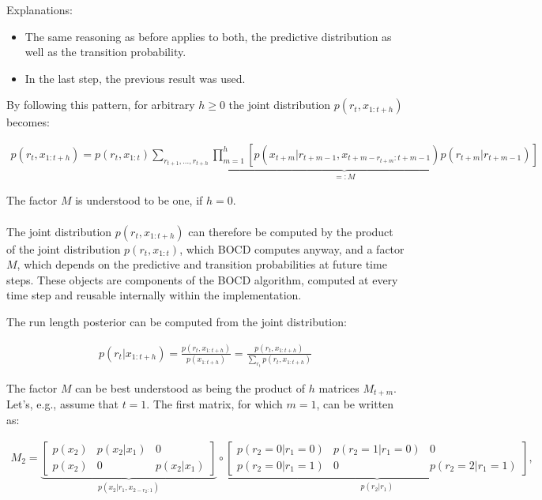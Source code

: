 \documentclass{article}
\begin{document}
Explanations:
\begin{itemize}
    \item The same reasoning as before applies to both, the predictive distribution as well as the transition probability.
    \item In the last step, the previous result was used.
\end{itemize}

By following this pattern, for arbitrary $h\geq0$ the joint distribution $p\left(r_{t},x_{1:t+h}\right)$ becomes:

\begin{align}
p(r_{t},x_{1:t+h})=p(r_{t},x_{1:t})\underbrace{\sum_{r_{t+1},...,r_{t+h}}\prod_{m=1}^{h}\left[p(x_{t+m}\vert r_{t+m-1},x_{t+m-r_{t+m}:t+m-1})p(r_{t+m}\vert r_{t+m-1})\right]}_{=:M}
\end{align}

The factor $M$ is understood to be one, if $h=0$.\\\\

The joint distribution $p\left(r_{t},x_{1:t+h}\right)$ can therefore be computed by the product of the joint distribution $p(r_{t},x_{1:t})$, which BOCD computes anyway, and a factor $M$, which depends on the predictive and transition probabilities at future time steps. These objects are components of the BOCD algorithm, computed at every time step and reusable internally within the implementation.

The run length posterior can be computed from the joint distribution:

\begin{align}
p(r_{t}\vert x_{1:t+h})=\frac{p(r_{t},x_{1:t+h})}{p(x_{1:t+h})}=\frac{p(r_{t},x_{1:t+h})}{\sum_{r_{t}}p(r_{t},x_{1:t+h})}
\end{align}

The factor $M$ can be best understood as being the product of $h$ matrices $M_{t+m}$. Let's, e.g., assume that $t=1$. The first matrix, for which $m=1$, can be written as:

\begin{align}
M_{2}=\underbrace{\left[\begin{array}{ccc}
p(x_{2}) & p(x_{2}\vert x_{1}) & 0\\
p(x_{2}) & 0 & p(x_{2}\vert x_{1})
\end{array}\right]}_{p(x_{2}\vert r_{1},x_{2-r_{2}:1})}\circ\underbrace{\left[\begin{array}{ccc}
p(r_{2}=0\vert r_{1}=0) & p(r_{2}=1\vert r_{1}=0) & 0\\
p(r_{2}=0\vert r_{1}=1) & 0 & p(r_{2}=2\vert r_{1}=1)
\end{array}\right]}_{p(r_{2}\vert r_{1})},
\end{align}
\end{document}
